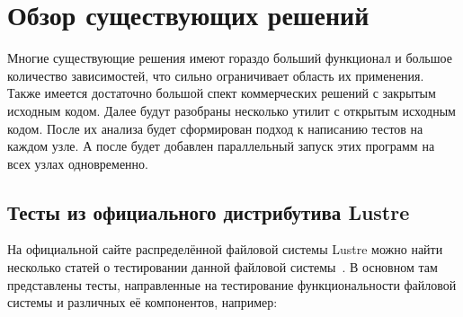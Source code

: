\section{Обзор существующих решений}
\label{sec:Chapter2} 

Многие существующие решения имеют гораздо больший функционал и большое количество зависимостей,
что сильно ограничивает область их применения. Также имеется достаточно большой спект коммерческих
решений с закрытым исходным кодом. Далее будут разобраны несколько утилит с открытым исходным кодом.
После их анализа будет сформирован подход к написанию тестов на каждом узле. А после будет добавлен
параллельный запуск этих программ на всех узлах одновременно.

\subsection{Тесты из официального дистрибутива Lustre}
На официальной сайте распределённой файловой системы Lustre можно найти несколько статей о
тестировании данной файловой системы~\cite{lustre_tests}. В основном там представлены тесты,
направленные на тестирование функциональности файловой системы и различных её компонентов, например: 
